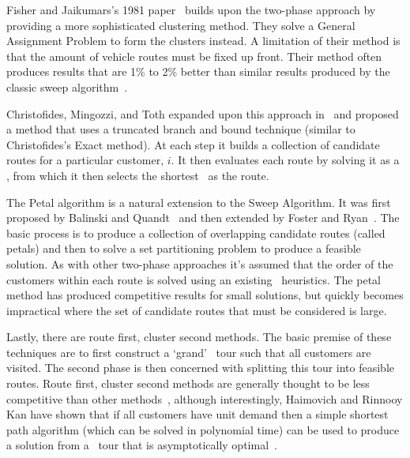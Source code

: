 
Fisher and Jaikumars's 1981 paper~\cite{FJ:1981} builds upon the two-phase approach by providing a more sophisticated clustering method. They solve a General Assignment Problem to form the clusters instead. A limitation of their method is that the amount of vehicle routes must be fixed up front. Their method often produces results that are 1\% to 2\% better than similar results produced by the classic sweep algorithm~\cite{TV2001}. 

Christofides, Mingozzi, and Toth expanded upon this approach in~\cite{CMT:1981} and proposed a method that uses a truncated branch and bound technique (similar to Christofides's Exact method). At each step it builds a collection of candidate routes for a particular customer, $i$. It then evaluates each route by solving it as a \TSP, from which it then selects the shortest \TSP\ as the route.

The Petal algorithm is a natural extension to the Sweep Algorithm. It was first proposed by Balinski and Quandt~\cite{balinski:64} and then extended by Foster and Ryan~\cite{FR:1976}. The basic process is to produce a collection of overlapping candidate routes (called petals) and then to solve a set partitioning problem to produce a feasible solution. As with other two-phase approaches it's assumed that the order of the customers within each route is solved using an existing \TSP\ heuristics. The petal method has produced competitive results for small solutions, but quickly becomes impractical where the set of candidate routes that must be considered is large.  

Lastly, there are route first, cluster second methods. The basic premise of these techniques are to first construct a `grand' \TSP\ tour such that all customers are visited. The second phase is then concerned with splitting this tour into feasible routes. Route first, cluster second methods are generally thought to be less competitive than other methods~\cite{Laporte:1999}, although interestingly, Haimovich and Rinnooy Kan have shown that if all customers have unit demand then a simple shortest path algorithm (which can be solved in polynomial time) can be used to produce a solution from a \TSP\ tour that is asymptotically optimal~\cite{HK:1985}.

